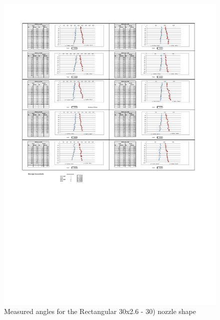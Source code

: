 \begin{figure}[ht]
    \centering
    \includegraphics[width=\linewidth]{Images/Rec30_30.pdf}
    \caption{Measured angles for the Rectangular 30x2.6 - 30) nozzle shape}
\end{figure}

